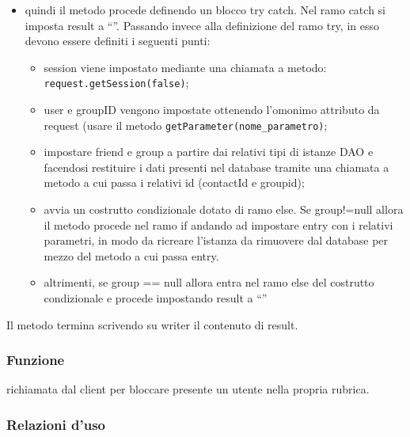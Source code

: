\begin{description}
\begin{itemize}
		\item quindi il metodo procede definendo un blocco try catch. Nel ramo catch si imposta result a ``''. Passando invece alla definizione del ramo try, in esso devono essere definiti i seguenti punti:
		\begin{itemize}
			\item session viene impostato mediante una chiamata a metodo:
			\verb|request.getSession(false)|;
			\item user e groupID vengono impostate ottenendo l'omonimo attributo da request (usare il metodo \texttt{getParameter(nome\_parametro)};
			\item impostare friend e group a partire dai relativi tipi di istanze DAO e facendosi restituire i dati presenti nel database tramite una chiamata a metodo  a cui passa i relativi id (contactId e groupid);
			\item avvia un costrutto condizionale dotato di ramo else. Se group!=null allora il metodo procede nel ramo if andando ad impostare entry con i relativi parametri, in modo da ricreare l'istanza  da rimuovere dal database per mezzo del metodo  a cui passa entry. 
			\item altrimenti, se group == null allora entra nel ramo else del costrutto condizionale e procede impostando result a ``''
		\end{itemize}
	\end{itemize}
	Il metodo termina scrivendo su writer il contenuto di result.
	
\end{description}



\subsubsection*{Funzione}
 richiamata dal client per bloccare presente un utente nella propria rubrica.

\subsubsection*{Relazioni d'uso}

